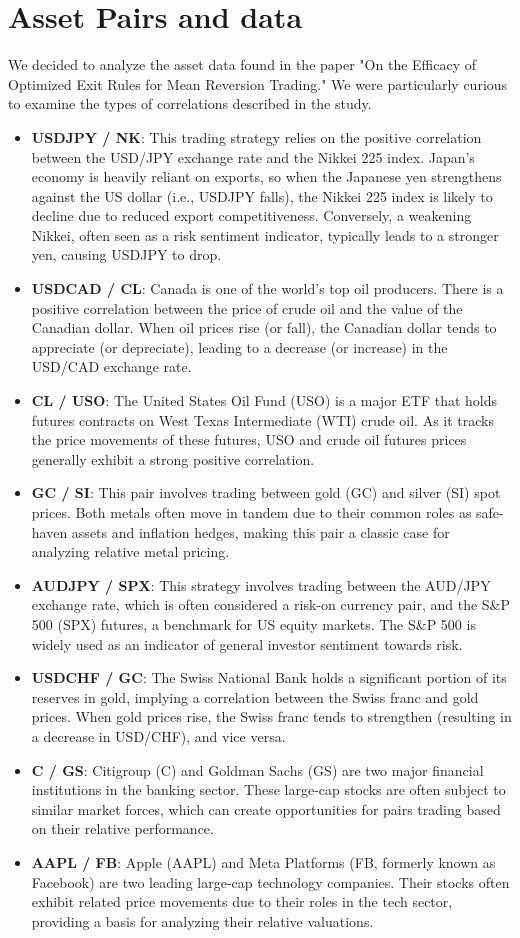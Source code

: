 \documentclass{article}
\begin{document}
\section*{Asset Pairs and data}
We decided to analyze the asset data found in the paper "On the Efficacy of Optimized Exit Rules for Mean Reversion Trading." We were particularly curious to examine the types of correlations described in the study.
\begin{itemize}
    \item \textbf{USDJPY / NK}: This trading strategy relies on the positive correlation between the USD/JPY exchange rate and the Nikkei 225 index. Japan's economy is heavily reliant on exports, so when the Japanese yen strengthens against the US dollar (i.e., USDJPY falls), the Nikkei 225 index is likely to decline due to reduced export competitiveness. Conversely, a weakening Nikkei, often seen as a risk sentiment indicator, typically leads to a stronger yen, causing USDJPY to drop.
    \item \textbf{USDCAD / CL}: Canada is one of the world's top oil producers. There is a positive correlation between the price of crude oil and the value of the Canadian dollar. When oil prices rise (or fall), the Canadian dollar tends to appreciate (or depreciate), leading to a decrease (or increase) in the USD/CAD exchange rate.
    \item \textbf{CL / USO}: The United States Oil Fund (USO) is a major ETF that holds futures contracts on West Texas Intermediate (WTI) crude oil. As it tracks the price movements of these futures, USO and crude oil futures prices generally exhibit a strong positive correlation.
    \item \textbf{GC / SI}: This pair involves trading between gold (GC) and silver (SI) spot prices. Both metals often move in tandem due to their common roles as safe-haven assets and inflation hedges, making this pair a classic case for analyzing relative metal pricing.
    \item \textbf{AUDJPY / SPX}: This strategy involves trading between the AUD/JPY exchange rate, which is often considered a risk-on currency pair, and the S\&P 500 (SPX) futures, a benchmark for US equity markets. The S\&P 500 is widely used as an indicator of general investor sentiment towards risk.
    \item \textbf{USDCHF / GC}: The Swiss National Bank holds a significant portion of its reserves in gold, implying a correlation between the Swiss franc and gold prices. When gold prices rise, the Swiss franc tends to strengthen (resulting in a decrease in USD/CHF), and vice versa.
    \item \textbf{C / GS}: Citigroup (C) and Goldman Sachs (GS) are two major financial institutions in the banking sector. These large-cap stocks are often subject to similar market forces, which can create opportunities for pairs trading based on their relative performance.
    \item \textbf{AAPL / FB}: Apple (AAPL) and Meta Platforms (FB, formerly known as Facebook) are two leading large-cap technology companies. Their stocks often exhibit related price movements due to their roles in the tech sector, providing a basis for analyzing their relative valuations.
\end{itemize}
\end{document}
